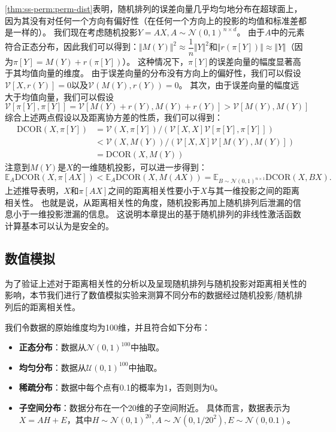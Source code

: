 \autoref{thm:ss-perm:perm-dist}表明，随机排列的误差向量几乎均匀地分布在超球面上，因为其没有对任何一个方向有偏好性（在任何一个方向上的投影的均值和标准差都是一样的）。
%
我们现在考虑随机投影$Y = AX, A \sim \mathcal N(0, 1)^{n\times d}$。
由于$A$中的元素符合正态分布，因此我们可以得到：$\Vert M(Y) \Vert^2 \approx  \dfrac{1}{n} \Vert Y \Vert^2$和$\Vert r(\pi[Y]) \Vert \approx \Vert Y \Vert$（因为$\pi[Y] = M(Y) + r(\pi[Y])$）。
%
这种情况下，$\pi[Y]$的误差向量的幅度显著高于其均值向量的维度。
%
由于误差向量的分布没有方向上的偏好性，我们可以假设$\mathcal{V}[X, r(Y)] = 0$以及$\mathcal{V}(M(Y), r(Y)) = 0$。
%
其次，由于误差向量的幅度远大于均值向量，我们可以假设
\begin{equation}
\mathcal{V}[\pi[Y], \pi[Y]] = \mathcal{V}[M(Y) + r(Y), M(Y) + r(Y)] > \mathcal{V}[M(Y), M(Y)]
\end{equation}
%
综合上述两点假设以及距离协方差的性质，我们可以得到：
\begin{equation}
\begin{split}
    \text{DCOR}(X, \pi[Y]) &= \mathcal{V}(X, \pi[Y]) / (\mathcal{V}[X, X] \mathcal{V}[\pi[Y], \pi[Y]]) \\
    & < \mathcal{V}(X, M(Y)) / (\mathcal{V}[X, X] \mathcal{V}[M(Y), M(Y)]) \\
    & = \text{DCOR}(X, M(Y))
\end{split}
\end{equation}
注意到$M(Y)$是$X$的一维随机投影，可以进一步得到：
\begin{equation}
    \mathbb E_A \text{DCOR}(X, \pi[AX]) < \mathbb E_A \text{DCOR}(X, M(AX)) = \mathbb E_{B \sim \mathcal N(0, 1)^{n\times 1}} \text{DCOR}(X, BX).
\end{equation}
%
上述推导表明，$X$和$\pi[AX]$之间的距离相关性要小于$X$与其一维投影之间的距离相关性。
也就是说，从距离相关性的角度，随机投影再加上随机排列后泄漏的信息小于一维投影泄漏的信息。
%
这说明本章提出的基于随机排列的非线性激活函数计算基本可以认为是安全的。


\subsection{数值模拟}
为了验证上述对于距离相关性的分析以及呈现随机排列与随机投影对距离相关性的影响，本节我们进行了数值模拟实验来测算不同分布的数据经过随机投影/随机排列后的距离相关性。
%

我们令数据的原始维度均为100维，并且符合如下分布：
\begin{itemize}
    \item \textbf{正态分布}：数据从$\mathcal N(0, 1)^{100}$中抽取。
    \item \textbf{均匀分布}：数据从$\mathcal U(0, 1)^{100}$中抽取。
    \item \textbf{稀疏分布}：数据中每个点有0.1的概率为1，否则则为0。
    \item \textbf{子空间分布}：数据分布在一个20维的子空间附近。
    具体而言，数据表示为$X = AH + E$，其中$H \sim \mathcal N(0, 1)^{20}, A \sim \mathcal N(0, 1/{20^2}), E \sim \mathcal N(0, 0.1)$。
\end{itemize}


